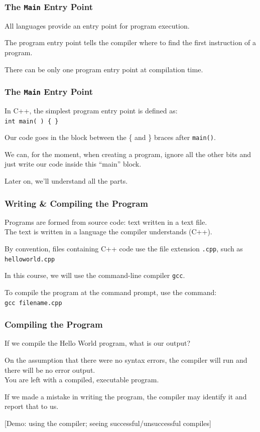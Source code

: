 \begin{frame}
\frametitle{The \texttt{Main} Entry Point}

All languages provide an entry point for program execution.

The \alert{program entry point}  tells the compiler where to find the first instruction of a program.

There can be only one program entry point at compilation time.

\end{frame}

\begin{frame}
\frametitle{The \texttt{Main} Entry Point}


In C++, the simplest program entry point is defined as:\\
\quad	\texttt{int main( ) \{ \}}

Our code goes in the block between the \{ and \} braces after \texttt{main()}.

We can, for the moment, when creating a program, ignore all the other bits and just write our code inside this ``main'' block.

Later on, we'll understand all the parts.

\end{frame}

\begin{frame}
\frametitle{Writing \& Compiling the Program}
Programs are formed from source code: text written in a text file.\\
\quad The text is written in a language the compiler understands (C++).

By convention,  files containing C++ code use the file extension \texttt{.cpp}, such as \texttt{helloworld.cpp}

In this course, we will use the command-line compiler \texttt{gcc}.

To compile the program at the command prompt, use the command:\\
\quad \texttt{gcc filename.cpp}

\end{frame}

\begin{frame}
\frametitle{Compiling the Program}

If we compile the Hello World program, what is our output?

On the assumption that there were no syntax errors, the compiler will run and there will be no error output.\\
\quad You are left with a compiled, executable program.

If we made a mistake in writing the program, the compiler may identify it and report that to us.

[Demo: using the compiler; seeing successful/unsuccessful compiles]

\end{frame}

